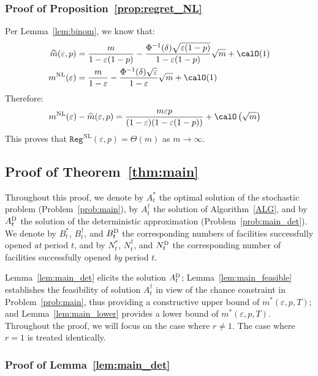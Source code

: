 \documentclass[blindrev]{informs3noheader}
\begin{document}
\subsubsection{Proof of Proposition~\ref{prop:regret_NL}}

Per Lemma~\ref{lem:binom}, we know that:
\begin{align}
\widehat{m}(\varepsilon,p)&=\frac{m}{1-\varepsilon(1-p)}-\frac{\Phi^{-1}(\delta)\sqrt{\varepsilon(1-p)}}{1-\varepsilon(1-p)}\sqrt{m}+\calO(1)\label{eq:mhat}\\
m^{\text{NL}}(\varepsilon)&=\frac{m}{1-\varepsilon}-\frac{\Phi^{-1}(\delta)\sqrt{\varepsilon}}{1-\varepsilon}\sqrt{m}+\calO(1)\label{eq:mNL}
\end{align}
Therefore:
\begin{align*}
m^{\text{NL}}(\varepsilon)-\widehat{m}(\varepsilon,p)
&=\frac{m\varepsilon p}{(1-\varepsilon)(1-\varepsilon(1-p))}+\calO\left(\sqrt m\right)
\end{align*}
This proves that $\texttt{Reg}^{\text{NL}}(\varepsilon,p)=\Theta(m)$ as $m\to\infty$.

\subsection{Proof of Theorem~\ref{thm:main}}

Throughout this proof, we denote by $A^*_{t}$ the optimal solution of the stochastic problem (Problem~\eqref{prob:main}), by $A^\dagger_{t}$ the solution of Algorithm~\ref{ALG}, and by $A^{\textsc{D}}_{t}$ the solution of the deterministic approximation (Problem~\eqref{prob:main_det}). We denote by $B^*_{t}$, $B^\dagger_{t}$, and $B^{\textsc{D}}_{t}$ the corresponding numbers of facilities successfully opened \emph{at} period $t$, and by $N^*_{t}$, $N^\dagger_{t}$, and $N^{\textsc{D}}_{t}$ the corresponding number of facilities successfully opened \emph{by} period $t$.

Lemma~\ref{lem:main_det} elicits the solution $A^{\textsc{D}}_{t}$; Lemma~\ref{lem:main_feasible} establishes the feasibility of solution $A^\dagger_{t}$ in view of the chance constraint in Problem~\eqref{prob:main}, thus providing a constructive upper bound of $m^*(\varepsilon, p,T)$; and Lemma~\ref{lem:main_lower} provides a lower bound of $m^*(\varepsilon, p,T)$. Throughout the proof, we will focus on the case where $r\neq 1$. The case where $r=1$ is treated identically.

\subsubsection{Proof of Lemma~\ref{lem:main_det}}
\end{document}
